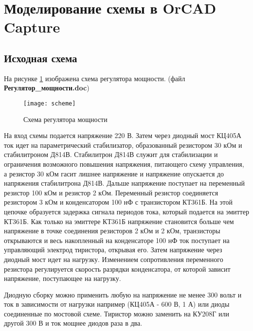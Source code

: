 





\tableofcontents
\newpage

\section{Моделирование схемы в OrCAD Capture}

\subsection{Исходная схема}

На рисунке \ref{pic:scheme} изображена схема регулятора мощности. (файл \textbf{Регулятор\_мощности.doc})

\begin{figure}[H]
\begin{center}
	\texttt{[image: scheme]}
	\caption{Схема регулятора мощности}
	\label{pic:scheme}
\end{center}
\end{figure}

На вход схемы подается напряжение 220 В. Затем через диодный мост КЦ405А ток идет на параметрический стабилизатор, образованный резистором 30 кОм и стабилитроном Д814В. Стабилитрон Д814В служит для стабилизации и ограничения возможного повышения напряжения, питающего схему управления, а резистор 30 кОм гасит лишнее напряжение и напряжение опускается до напряжения стабилитрона Д814В. Дальше напряжение поступает на переменный резистор 100 кОм и резистор 2 кОм. Переменный резистор соединяется резистором 3 кОм и конденсатором 100 нФ с транзистором КТ361Б. На этой цепочке образуется задержка сигнала периодов тока, который подается на эмиттер КТ361Б. Как только на эмиттере КТ361Б напряжение становится больше чем напряжение в точке соединения резисторов 2 кОм и 2 кОм, транзисторы открываются и весь накопленный на конденсаторе 100 нФ ток поступает на управляющий электрод тиристора, открывая его. Затем напряжение через диодный мост идет на нагрузку. Изменением сопротивления переменного резистора регулируется скорость разрядки конденсатора, от которой зависит напряжение, поступающее на нагрузку.

 Диодную сборку можно применить любую на напряжение не менее 300 вольт и ток в зависимости от нагрузки например (КЦ405А - 600 В, 1 А) или диоды соединенные по мостовой схеме. Тиристор можно заменить на КУ208Г или другой 300 В и ток мощнее диодов раза в два.

